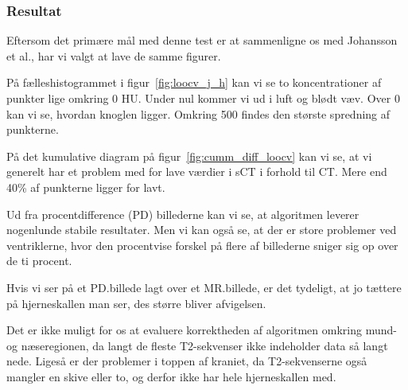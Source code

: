 \subsubsection{Resultat}

Eftersom det primære mål med denne test er at sammenligne os med Johansson et al., har vi valgt at lave de samme figurer.

På fælleshistogrammet i figur~\ref{fig:loocv_j_h} kan vi se to koncentrationer af punkter lige omkring 0 HU. Under nul kommer vi ud i luft og blødt væv. Over 0 kan vi se, hvordan knoglen ligger. Omkring 500 findes den største spredning af punkterne.

På det kumulative diagram på figur~\ref{fig:cumm_diff_loocv} kan vi se, at vi generelt har et problem med for lave værdier i sCT i forhold til CT. Mere end 40\% af punkterne ligger for lavt.

Ud fra procentdifference (PD) billederne kan vi se, at algoritmen leverer nogenlunde stabile resultater. Men vi kan også se, at der er store problemer ved ventriklerne, hvor den procentvise forskel på flere af billederne sniger sig op over de ti procent.

Hvis vi ser på et PD.billede lagt over et MR.billede, er det tydeligt, at jo tættere på hjerneskallen man ser, des større bliver afvigelsen.

Det er ikke muligt for os at evaluere korrektheden af algoritmen omkring mund- og næseregionen, da langt de fleste T2-sekvenser ikke indeholder data så langt nede. Ligeså er der problemer i toppen af kraniet, da T2-sekvenserne også mangler en skive eller to, og derfor ikke har hele hjerneskallen med.

